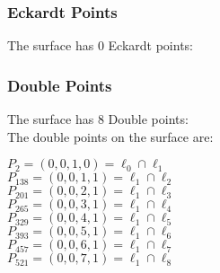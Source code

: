 \documentclass{article}
\begin{document}
{\subsubsection*{Eckardt Points}
The surface has 0 Eckardt points:\\
\subsubsection*{Double Points}
The surface has 8 Double points:\\
The double points on the surface are:\\
\begin{multicols}{2}
\noindent
$P_{2} = ( 0, 0, 1, 0 ) = \ell_{0} \cap \ell_{1} $\\
$P_{138} = ( 0, 0, 1, 1 ) = \ell_{1} \cap \ell_{2} $\\
$P_{201} = ( 0, 0, 2, 1 ) = \ell_{1} \cap \ell_{3} $\\
$P_{265} = ( 0, 0, 3, 1 ) = \ell_{1} \cap \ell_{4} $\\
$P_{329} = ( 0, 0, 4, 1 ) = \ell_{1} \cap \ell_{5} $\\
$P_{393} = ( 0, 0, 5, 1 ) = \ell_{1} \cap \ell_{6} $\\
$P_{457} = ( 0, 0, 6, 1 ) = \ell_{1} \cap \ell_{7} $\\
$P_{521} = ( 0, 0, 7, 1 ) = \ell_{1} \cap \ell_{8} $\\
\end{multicols}
}
\end{document}
